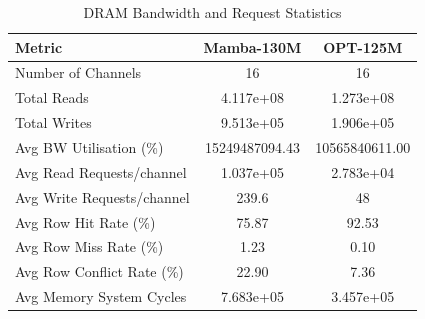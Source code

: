 \begin{table}[h]\centering
    \caption{DRAM Bandwidth and Request Statistics}
    \label{tab:dram_detailed}
    \begin{tabular}{lcc}\hline
    Metric & Mamba-130M & OPT-125M \\\hline
        Number of Channels & 16 & 16 \\
    Total Reads & 4.117e+08 & 1.273e+08 \\
    Total Writes & 9.513e+05 & 1.906e+05 \\
    Avg BW Utilisation (\%) & 15249487094.43 & 10565840611.00 \\
    Avg Read Requests/channel & 1.037e+05 & 2.783e+04 \\
    Avg Write Requests/channel & 239.6 & 48 \\
    Avg Row Hit Rate (\%) & 75.87 & 92.53 \\
    Avg Row Miss Rate (\%) & 1.23 & 0.10 \\
    Avg Row Conflict Rate (\%) & 22.90 & 7.36 \\
    Avg Memory System Cycles & 7.683e+05 & 3.457e+05 \\
\hline\end{tabular}\end{table}